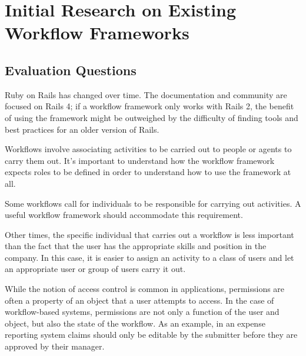 \documentclass[document.tex]{subfiles}
\begin{document}
\chapter {Initial Research on Existing Workflow Frameworks}

\section {Evaluation Questions}
\label {sec:evaluation-questions}



Ruby on Rails has changed over time. The documentation and community are focused on Rails 4; if a workflow framework only works with Rails 2, the benefit of using the framework might be outweighed by the difficulty of finding tools and best practices for an older version of Rails.


Workflows involve associating activities to be carried out to people or agents to carry them out. It's important to understand how the workflow framework expects roles to be defined in order to understand how to use the framework at all.


Some workflows call for individuals to be responsible for carrying out activities. A useful workflow framework should accommodate this requirement.


Other times, the specific individual that carries out a workflow is less important than the fact that the user has the appropriate skills and position in the company. In this case, it is easier to assign an activity to a class of users and let an appropriate user or group of users carry it out.

 
While the notion of access control is common in applications, permissions are often a property of an object that a user attempts to access. In the case of workflow-based systems, permissions are not only a function of the user and object, but also the state of the workflow. As an example, in an expense reporting system claims should only be editable by the submitter before they are approved by their manager.
\end{document}
